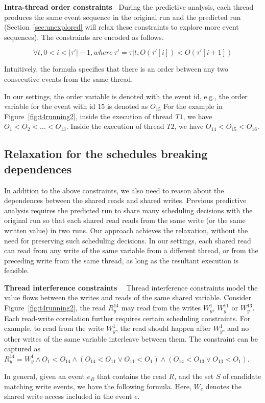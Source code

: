 {\bf Intra-thread order constraints\ } During the predictive analysis, each thread produces the same event sequence in the original run and the predicted run (Section~\ref{sec:unexplored} will relax these constraints to explore more event sequences).  
The constraints are encoded as follows. 

$$
\forall t,  0<i<|\tau'|-1, where\  \tau'=\tau|t, O(\tau'[i])<O(\tau'[i+1])
$$

  
Intuitively, the formula specifies that there is an order between any two consecutive events from the same thread. 

 In our settings, the order variable is denoted with the event id, e.g., the order variable for the event with id $15$ is denoted as $O_{15}$
For the example in Figure~\ref{fig:t4running2}, inside the execution of thread $T1$, we have $O_1<O_2 < \dots < O_{13}$. 
Inside the execution of thread $T2$, we have $O_{14}<O_{15}<O_{16}$.


\subsection{Relaxation for the schedules breaking dependences}
In addition to the above constraints, we also need to reason about the dependences between the shared reads and shared writes. 
 Previous predictive analysis requires the predicted run to share many scheduling decisions with the original run so that each shared read reads from the same write (or the same written value) in two runs. Our approach achieves the relaxation, without the need for preserving such scheduling decisions. In our settings, each shared read can read from any write of the same variable from a different thread, or from the preceding write from the same thread, as long as the resultant execution is feasible.
 

{\bf Thread interference constraints \ }  Thread interference constraints model the value flows between the writes and reads of the same shared variable. 
Consider Figure~\ref{fig:t4running2},  the read $R^{14}_y$ may read from the writes $W^1_y$, $W^{11}_y$ or $W^{13}_y$.
Each read-write correlation further requires certain scheduling constraints. For example, to read from the write $W^1_y$, the read should happen after $W^1_y$, and no other writes of the same variable interleave between them. The constraint can be captured as $R^{14}_y=W^1_y \wedge O_1<O_{14} \wedge (O_{14}<O_{11} \vee O_{11} < O_1) \wedge (O_{14}<O_{13} \vee O_{13}<O_{1})$.  

In general,  given an event $e_R$ that contains the read $R$, and the set $S$ of candidate matching write events, we have the following formula. Here, $W_e$ denotes the shared write access included in the event $e$. 


